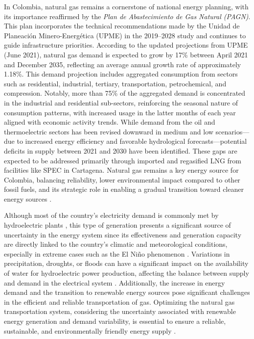 In Colombia, natural gas remains a cornerstone of national energy planning, with its importance reaffirmed by the \textit{Plan de Abastecimiento de Gas Natural (PAGN)}. This plan incorporates the technical recommendations made by the Unidad de Planeación Minero-Energética (UPME) in the 2019–2028 study and continues to guide infrastructure priorities. According to the updated projections from UPME (June 2021), natural gas demand is expected to grow by 17\% between April 2021 and December 2035, reflecting an average annual growth rate of approximately 1.18\%. This demand projection includes aggregated consumption from sectors such as residential, industrial, tertiary, transportation, petrochemical, and compression. Notably, more than 75\% of the aggregated demand is concentrated in the industrial and residential sub-sectors, reinforcing the seasonal nature of consumption patterns, with increased usage in the latter months of each year aligned with economic activity trends. While demand from the oil and thermoelectric sectors has been revised downward in medium and low scenarios—due to increased energy efficiency and favorable hydrological forecasts—potential deficits in supply between 2021 and 2030 have been identified. These gaps are expected to be addressed primarily through imported and regasified LNG from facilities like SPEC in Cartagena. Natural gas remains a key energy source for Colombia, balancing reliability, lower environmental impact compared to other fossil fuels, and its strategic role in enabling a gradual transition toward cleaner energy sources \cite{Promigas_2021}.


Although most of the country's electricity demand is commonly met by hydroelectric plants \cite{Arango-Aramburo_Turner_Daenzer_Ríos-Ocampo_Hejazi_Kober_Álvarez-Espinosa_Romero-Otalora_vanderZwaan_2019}, this type of generation presents a significant source of uncertainty in the energy system since its effectiveness and generation capacity are directly linked to the country's climatic and meteorological conditions, especially in extreme cases such as the El Niño phenomenon \cite{Villa-Loaiza_Taype-Huaman_Benavides-Franco_Buenaventura-Vera_Carabalí-Mosquera_2023}. Variations in precipitation, droughts, or floods can have a significant impact on the availability of water for hydroelectric power production, affecting the balance between supply and demand in the electrical system \cite{Ignacio_Fariza_2022}. Additionally, the increase in energy demand and the transition to renewable energy sources pose significant challenges in the efficient and reliable transportation of gas. Optimizing the natural gas transportation system, considering the uncertainty associated with renewable energy generation and demand variability, is essential to ensure a reliable, sustainable, and environmentally friendly energy supply \cite{Shan_Yu_Gong_Huang_Wen_Wang_Ren_Wang_Shi_Liu_2023}.




